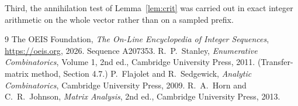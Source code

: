 \documentclass[11pt,a4paper]{article}
\theoremstyle{plain}
\theoremstyle{definition}
\begin{document}
Third, the annihilation test of Lemma~\ref{lem:crit} was carried out in exact integer
arithmetic on the whole vector rather than on a sampled prefix.

\begin{thebibliography}{9}
 The OEIS Foundation, \emph{The On-Line Encyclopedia of Integer
Sequences}, \url{https://oeis.org}, 2026. Sequence A207353.
 R.~P.~Stanley, \emph{Enumerative Combinatorics}, Volume 1, 2nd ed.,
Cambridge University Press, 2011. (Transfer-matrix method, Section 4.7.)
 P.~Flajolet and R.~Sedgewick, \emph{Analytic Combinatorics}, Cambridge
University Press, 2009.
 R.~A.~Horn and C.~R.~Johnson, \emph{Matrix Analysis}, 2nd ed., Cambridge
University Press, 2013.
\end{thebibliography}
\end{document}
